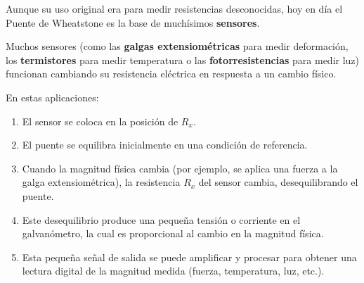 \documentclass{article}
\begin{document}
Aunque su uso original era para medir resistencias desconocidas, hoy en día el Puente de Wheatstone es la base de muchísimos \textbf{sensores}.

Muchos sensores (como las \textbf{galgas extensiométricas} para medir deformación, los \textbf{termistores} para medir temperatura o las \textbf{fotorresistencias} para medir luz) funcionan cambiando su resistencia eléctrica en respuesta a un cambio físico.

En estas aplicaciones:
\begin{enumerate}
    \item El sensor se coloca en la posición de $R_x$.
    \item El puente se equilibra inicialmente en una condición de referencia.
    \item Cuando la magnitud física cambia (por ejemplo, se aplica una fuerza a la galga extensiométrica), la resistencia $R_x$ del sensor cambia, desequilibrando el puente.
    \item Este desequilibrio produce una pequeña tensión o corriente en el galvanómetro, la cual es proporcional al cambio en la magnitud física.
    \item Esta pequeña señal de salida se puede amplificar y procesar para obtener una lectura digital de la magnitud medida (fuerza, temperatura, luz, etc.).
\end{enumerate}
\end{document}
